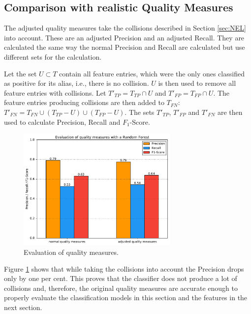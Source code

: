 \subsection{Comparison with realistic Quality Measures}
The adjusted quality measures take the collisions described in Section \ref{sec:NEL} into account. These are an adjusted Precision and an adjusted Recall. They are calculated the same way the normal Precision and Recall are calculated but use different sets for the calculation.\par
Let the set $U \subset T$ contain all feature entries, which were the only ones classified as positive for its alias, i.e., there is no collision. $U$ is then used to remove all feature entries with collisions. Let $T'_{TP} = T_{TP} \cap U$ and $T'_{FP} = T_{FP} \cap U$. The feature entries producing collisions are then added to $T_{FN}$: $T'_{FN} = T_{FN} \cup (T_{TP} - U) \cup (T_{FP} - U)$. The sets $T'_{TP}$, $T'_{FP}$ and $T'_{FN}$ are then used to calculate Precision, Recall and $F_1$-Score.\par
\begin{figure}[H]
	\centering
	\includegraphics[width=0.7\textwidth]{img/qualitymeasure_eval}
	\caption{Evaluation of quality measures.}
	\label{qualitymeasure_eval}
\end{figure}
Figure \ref{qualitymeasure_eval} shows that while taking the collisions into account the Precision drops only by one per cent. This proves that the classifier does not produce a lot of collisions and, therefore, the original quality measures are accurate enough to properly evaluate the classification models in this section and the features in the next section.
